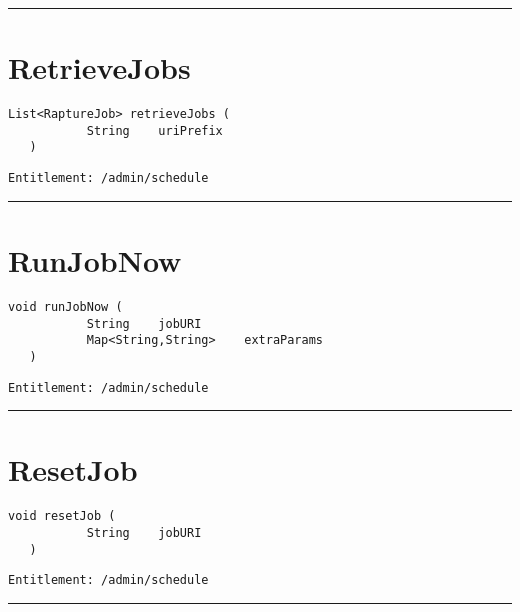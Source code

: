 \rule{12cm}{2pt}
\section{RetrieveJobs}
\label{Api:RetrieveJobs}
\begin{lstlisting}[style=nonumbers]
   List<RaptureJob> retrieveJobs (
           String    uriPrefix
   )
\end{lstlisting}
\begin{Verbatim}[formatcom=\color{Maroon}]
  Entitlement: /admin/schedule
\end{Verbatim}



\rule{12cm}{2pt}
\section{RunJobNow}
\label{Api:RunJobNow}
\begin{lstlisting}[style=nonumbers]
   void runJobNow (
           String    jobURI
           Map<String,String>    extraParams
   )
\end{lstlisting}
\begin{Verbatim}[formatcom=\color{Maroon}]
  Entitlement: /admin/schedule
\end{Verbatim}



\rule{12cm}{2pt}
\section{ResetJob}
\label{Api:ResetJob}
\begin{lstlisting}[style=nonumbers]
   void resetJob (
           String    jobURI
   )
\end{lstlisting}
\begin{Verbatim}[formatcom=\color{Maroon}]
  Entitlement: /admin/schedule
\end{Verbatim}



\rule{12cm}{2pt}
